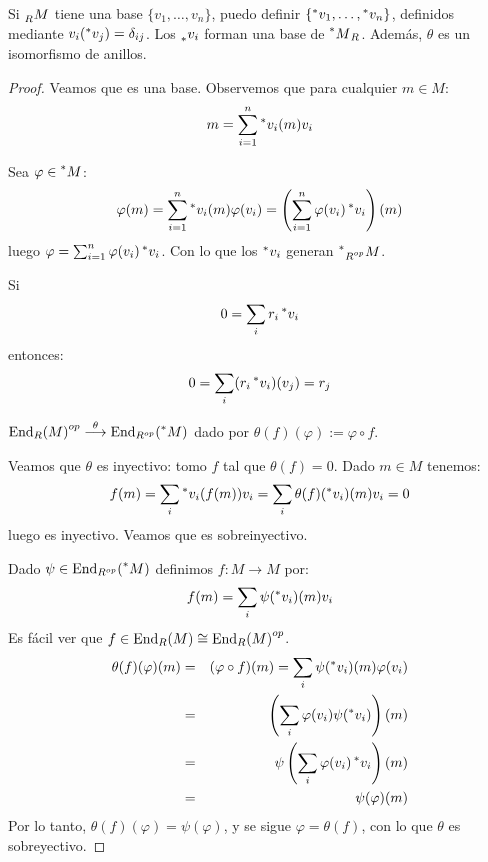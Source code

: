 \begin{prop}
  Si \(\prescript{}{R}{M}\) tiene una base \(\{v_1,\ldots,v_n\}\),
  puedo definir \(\{\prescript{*}{}{v_1},\ldots,
  \prescript{*}{}{v_n}\}\), definidos mediante \(v_i(
  \prescript{*}{}{v_j})=\delta_{ij}\). Los \(\prescript{}{*}{v_i}\)
  forman una base de \(\prescript{*}{}{M}_R\). Además, \(\theta\) es un
  isomorfismo de anillos.
\end{prop}
\begin{proof}
  Veamos que es una base. Observemos que para cualquier \(m\in M\):
  \[
    m=\sum_{i=1}^n \prescript{*}{}{v_i}(m)v_i
  \]

  Sea \(\varphi\in\prescript{*}{}{M}\):
  \[
    \varphi(m)=\sum_{i=1}^n \prescript{*}{}{v_i}(m)\varphi(v_i)
    =\left(\sum_{i=1}^n \varphi(v_i)\prescript{*}{}{v_i}\right)(m)
  \]
  luego \(\varphi=\sum_{i=1}^n \varphi(v_i)\prescript{*}{}{v_i}\).
  Con lo que los \(\prescript{*}{}{v_i}\) generan
  \(\prescript{*}{}{\prescript{}{R^{op}}{M}}\).

  Si
  \[
    0=\sum_i r_i\prescript{*}{}{v_i}
  \]
  entonces:
  \[
    0=\sum_i (r_i\prescript{*}{}{v_i})(v_j)=r_j
  \]

  \({\operatorname{End}_R(M)}^{op}\overset{\theta}{\longrightarrow}\operatorname{End}_{R^{op}}
  (\prescript{*}{}{M})\) dado por \(\theta(f)(\varphi):=\varphi\circ f\).

  Veamos que \(\theta\) es inyectivo: tomo \(f\) tal que \(\theta(f)=0\).
  Dado \(m\in M\) tenemos:
  \[
    f(m)=\sum_i \prescript{*}{}{v_i}(f(m))v_i
    =\sum_i \theta(f)(\prescript{*}{}{v_i})(m)v_i=0
  \]
  luego es inyectivo. Veamos que es sobreinyectivo.

  Dado \(\psi\in\operatorname{End}_{R^{op}}(\prescript{*}{}{M})\) definimos
  \(f:M\longrightarrow M\) por:
  \[
    f(m)=\sum_i \psi(\prescript{*}{}{v_i})(m)v_i
  \]
  Es fácil ver que \(f\in\operatorname{End}_R(M)\cong{\operatorname{End}_R(M)}^{op}\).
  \begin{eqnarray*}
    \theta(f)(\varphi)(m)&=&(\varphi\circ f)(m)=\sum_i
    \psi(\prescript{*}{}{v_i})(m)\varphi(v_i)\\
    &=&\left(\sum_i \varphi(v_i)\psi(\prescript{*}{}{v_i})\right)(m)\\
    &=&\psi\left(\sum_i \varphi(v_i)\prescript{*}{}{v_i}\right)(m)\\
    &=&\psi(\varphi)(m)
  \end{eqnarray*}
  Por lo tanto, \(\theta(f)(\varphi)=\psi(\varphi)\), y se sigue
  \(\varphi=\theta(f)\), con lo que \(\theta\) es sobreyectivo.

\end{proof}

